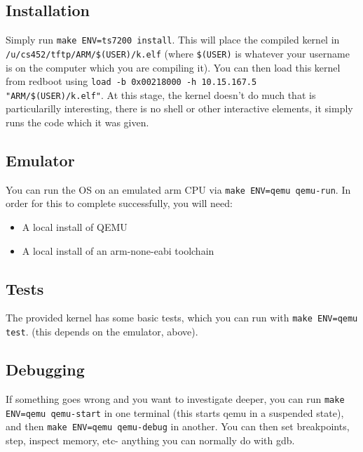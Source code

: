 \subsection{Installation}\label{installation}

Simply run \texttt{make ENV=ts7200 install}. This will place the
compiled kernel in \texttt{/u/cs452/tftp/ARM/\$(USER)/k.elf} (where
\texttt{\$(USER)} is whatever your username is on the computer which you
are compiling it). You can then load this kernel from redboot using
\texttt{load -b 0x00218000 -h 10.15.167.5 "ARM/\$(USER)/k.elf"}. At this
stage, the kernel doesn't do much that is particularilly interesting,
there is no shell or other interactive elements, it simply runs the code
which it was given.

\subsection{Emulator}\label{emulator}

You can run the OS on an emulated arm CPU via
\texttt{make ENV=qemu qemu-run}. In order for this to complete
successfully, you will need:

\begin{itemize}
\itemsep1pt\parskip0pt
\item
  A local install of QEMU
\item
  A local install of an arm-none-eabi toolchain
\end{itemize}

\subsection{Tests}\label{tests}

The provided kernel has some basic tests, which you can run with
\texttt{make ENV=qemu test}. (this depends on the emulator, above).

\subsection{Debugging}\label{debugging}

If something goes wrong and you want to investigate deeper, you can run
\texttt{make ENV=qemu qemu-start} in one terminal (this starts qemu in a
suspended state), and then \texttt{make ENV=qemu qemu-debug} in another.
You can then set breakpoints, step, inspect memory, etc- anything you
can normally do with gdb.
